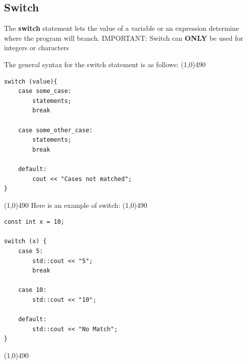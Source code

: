 \documentclass{report}
\begin{document}
    \subsection{Switch}
    \bigbreak \noindent 
    \begin{concept}
 The \textbf{switch} statement lets the value of a variable or an expression determine where the program will branch. IMPORTANT: Switch can \textbf{ONLY} be used for integers or characters
	\end{concept}
    \bigbreak \noindent 
    The general syntax for the switch statement is as follows:
    \bigbreak \noindent 
    \line(1,0){490}
    \begin{verbatim}
switch (value){
    case some_case:
        statements;
        break

    case some_other_case:
        statements;
        break

    default:
        cout << "Cases not matched";
}
    \end{verbatim}
    \line(1,0){490}
    \bigbreak \noindent 
    \bigbreak \noindent 
    Here is an example of switch:
    \bigbreak \noindent 
    \line(1,0){490}
    \begin{verbatim}
const int x = 10;

switch (x) {
    case 5:
        std::cout << "5";
        break

    case 10:
        std::cout << "10";

    default:
        std::cout << "No Match";
}
    \end{verbatim}
    \line(1,0){490}
    \bigbreak \noindent 

    \pagebreak \bigbreak \noindent 
\end{document}
